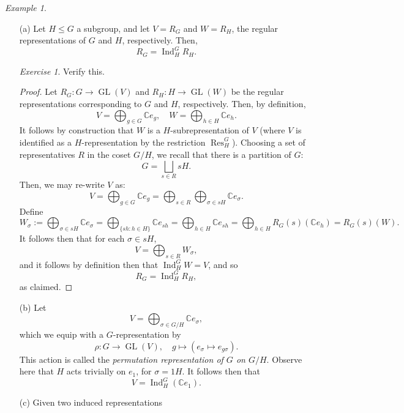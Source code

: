 \documentclass[a4paper]{report}
\theoremstyle{definition}
\theoremstyle{remark}
\theoremstyle{proposition}
\theoremstyle{conjecture}
\theoremstyle{lemma}
\theoremstyle{corollary}
\theoremstyle{exercise}
\newtheorem{exercise}{Exercise}
\theoremstyle{example}
\newtheorem{example}{Example}
\newcommand{\C}{\mathbb{C}}
\newcommand{\on}{\operatorname}
\begin{document}
\begin{example}\label{example_ind_properties}
    \leavevmode 
    \begin{itemize}
        \item[(a)] Let $H\leq G$ a subgroup, and let $V = R_G$ 
            and $W = R_H$, the regular representations of $G$ and 
            $H$, respectively. Then, 
            $$R_G = \on{Ind}_H^GR_H.$$
            \begin{exercise}
                Verify this.
            \end{exercise}
            \begin{proof}
                Let $R_G : G \to \on{GL}(V)$ and $R_H : H \to \on{GL}(W)$ 
                be the regular representations corresponding to $G$ and $H$,
                respectively. Then, by definition,
                $$V = \bigoplus_{g \in G}\C e_g, \quad W = \bigoplus_{h \in H}\C e_h.$$
                It follows by construction that $W$ is a $H$-subrepresentation 
                of $V$ (where $V$ is identified as a $H$-representation 
                by the restriction $\on{Res}_H^G$).
                Choosing a set of representatives $R$ in the coset $G/H$, 
                we recall that there is a partition of $G$:
                $$G = \bigsqcup_{s \in R} sH.$$
                Then, we may re-write $V$ as:
                $$V = \bigoplus_{g\in G}\C e_g = \bigoplus_{s\in R}\bigoplus_{\sigma \in sH} \C e_\sigma.$$
                Define $$W_\sigma := \bigoplus_{\sigma \in sH} \C e_\sigma = \bigoplus_{\lbrace sh : h\in H\rbrace} \C e_{sh} = \bigoplus_{h\in H} \C e_{sh} = \bigoplus_{h\in H} R_G(s)(\C e_h)=R_G(s)(W).$$
                It follows then that for each $\sigma \in sH$,
                $$V = \bigoplus_{s\in R} W_\sigma,$$
                and it follows by definition then that 
                $\on{Ind}_H^GW = V$, and so
                $$R_G = \on{Ind}_H^G R_H,$$
                as claimed.
            \end{proof}
        \item[(b)] Let $$V = \bigoplus_{\sigma \in G/H} \C e_\sigma,$$
            which we equip with a $G$-representation by
            $$\rho : G \longrightarrow \on{GL}(V),\quad g\longmapsto (e_\sigma \longmapsto e_{g\sigma}).$$
            This action is called the \emph{permutation representation of 
            $G$ on $G/H$}.
            Observe here that $H$ acts trivially on $e_1$, for $\sigma=1H$.
            It follows then that 
            $$V = \on{Ind}_H^G(\C e_1).$$
        \item[(c)] Given two induced representations 

\end{itemize}
\end{example}
\end{document}
